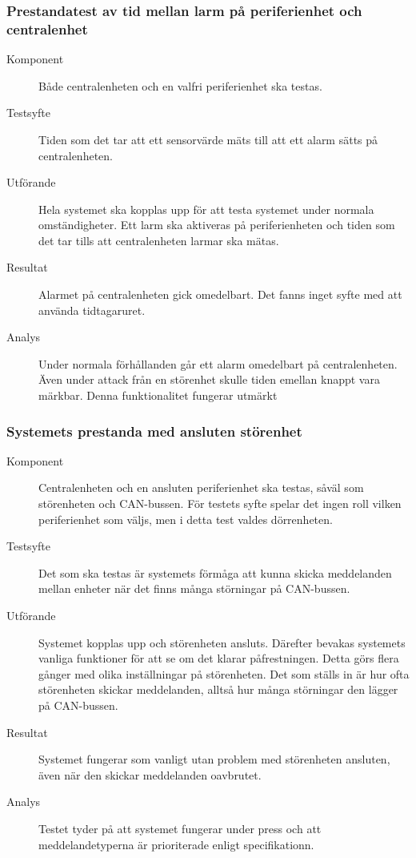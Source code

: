 \documentclass[a4paper]{article}
\begin{document}
\subsubsection{Prestandatest av tid mellan larm på periferienhet och centralenhet}
\begin{description}
\item[Komponent] Både centralenheten och en valfri periferienhet ska testas.

\item[Testsyfte] Tiden som det tar att ett sensorvärde mäts till att ett alarm sätts på centralenheten.

\item[Utförande] Hela systemet ska kopplas upp för att testa systemet under normala omständigheter. Ett larm ska aktiveras på periferienheten och tiden som det tar tills att centralenheten larmar ska mätas.

\item[Resultat] Alarmet på centralenheten gick omedelbart. Det fanns inget syfte med att använda tidtagaruret.

\item[Analys] Under normala förhållanden går ett alarm omedelbart på centralenheten. Även under attack från en störenhet skulle tiden emellan knappt vara märkbar. Denna funktionalitet fungerar utmärkt
\end{description}

\subsubsection{Systemets prestanda med ansluten störenhet}
\label{A:störenhet}
\begin{description}
\item[Komponent] Centralenheten och en ansluten periferienhet ska testas, såväl som störenheten och CAN-bussen.
För testets syfte spelar det ingen roll vilken periferienhet som väljs, men i detta test valdes dörrenheten.

\item[Testsyfte] Det som ska testas är systemets förmåga att kunna skicka meddelanden mellan enheter när det finns många störningar på CAN-bussen.

\item[Utförande] Systemet kopplas upp och störenheten ansluts.
Därefter bevakas systemets vanliga funktioner för att se om det klarar påfrestningen.
Detta görs flera gånger med olika inställningar på störenheten.
Det som ställs in är hur ofta störenheten skickar meddelanden, alltså hur många störningar den lägger på CAN-bussen.

\item[Resultat] Systemet fungerar som vanligt utan problem med störenheten ansluten, även när den skickar meddelanden oavbrutet.

\item[Analys] Testet tyder på att systemet fungerar under press och att meddelandetyperna är prioriterade enligt specifikationn.
\end{description}
\end{document}
